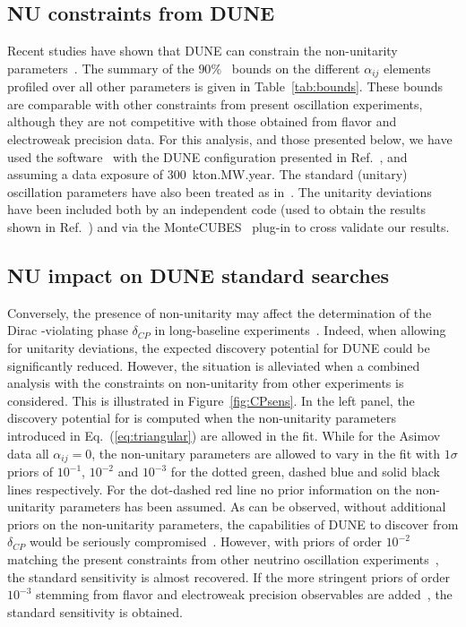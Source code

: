 \subsection{NU constraints from DUNE}
Recent studies have shown that DUNE can constrain the non-unitarity parameters~\cite{Blennow:2016jkn, Escrihuela:2016ube}. The summary of the $90 \%$~  bounds on the different $\alpha_{ij}$ elements profiled over all other parameters is given in Table~\ref{tab:bounds}. 
These bounds are comparable with other constraints from present oscillation experiments, although they are not competitive with those obtained from flavor and electroweak precision data.
For this analysis, and %
those presented below, we have used the  software~\cite{Huber:2004ka,Huber:2007ji} with the DUNE  configuration presented in Ref.~\cite{Alion:2016uaj}, and assuming a data exposure of 300~kton.MW.year. The standard (unitary) oscillation parameters have also been treated as in~\cite{Alion:2016uaj}. The unitarity deviations have been included both by an independent code (used to obtain the results shown in Ref.~\cite{Escrihuela:2016ube}) and via the MonteCUBES~\cite{Blennow:2009pk} plug-in to cross validate our results.

\subsection{NU impact on DUNE standard searches}
Conversely, the presence of non-unitarity may affect the determination of the
Dirac -violating phase $\delta_{CP}$ in long-baseline experiments~\cite{Miranda:2016wdr,Fernandez-Martinez:2016lgt,Escrihuela:2016ube}.
Indeed, when allowing for unitarity deviations, the expected  discovery potential for DUNE could be significantly reduced.
However, the situation is alleviated when a combined analysis with the constraints on non-unitarity from other experiments is considered. This is illustrated in Figure~\ref{fig:CPsens}. In the left panel, the discovery potential for  is computed when the non-unitarity parameters introduced in Eq.~(\ref{eq:triangular}) are allowed in the fit. While for the Asimov data all $\alpha_{ij}=0$, the non-unitary parameters are allowed to vary in the fit with $1 \sigma$ priors of $10^{-1}$, $10^{-2}$ and $10^{-3}$ for the dotted green, dashed blue and solid black lines respectively. For the dot-dashed red line no prior information on the non-unitarity parameters has been assumed. As can be observed, without additional priors on the non-unitarity parameters, the capabilities of DUNE to discover  from $\delta_{CP}$ would be seriously compromised~\cite{Escrihuela:2016ube}. However, with priors of order $10^{-2}$ matching the present constraints from other neutrino oscillation experiments~\cite{Escrihuela:2016ube,Blennow:2016jkn}, the standard sensitivity is almost recovered. If the more stringent priors of order $10^{-3}$ stemming from flavor and electroweak precision observables are added~\cite{Antusch:2014woa,Fernandez-Martinez:2016lgt}, the standard sensitivity is obtained.   

